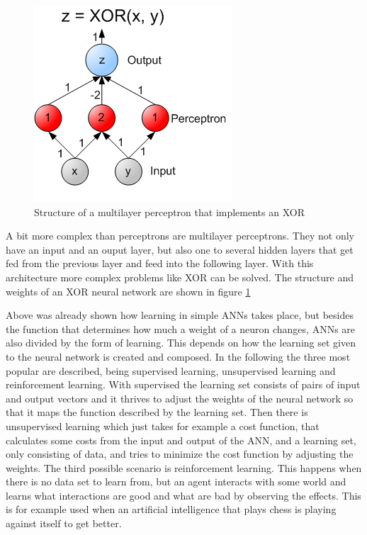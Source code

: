 \begin{figure}[ht]
	\centering
  \includegraphics[scale=0.7]{figures/multilayer_XOR.png}
	\caption[Structure of a multilayer perceptron that implements an XOR]{Structure of a multilayer perceptron that implements an XOR \protect\footnotemark}
	\label{multilayer_XOR}
\end{figure}

A bit more complex than perceptrons are multilayer perceptrons. They not only have an input and an ouput layer, but also one to several hidden layers that get fed from the previous layer and feed into the following layer. With this architecture more complex problems like XOR can be solved. The structure and weights of an XOR neural network are shown in figure \ref{multilayer_XOR}

Above was already shown how learning in simple ANNs takes place, but besides the function that determines how much a weight of a neuron changes, ANNs are also divided by the form of learning. This depends on how the learning set given to the neural network is created and composed. In the following the three most popular are described, being supervised learning, unsupervised learning and reinforcement learning. With supervised the learning set consists of pairs of input and output vectors and it thrives to adjust the weights of the neural network so that it maps the function described by the learning set. Then there is unsupervised learning which just takes for example a cost function, that calculates some costs from the input and output of the ANN, and a learning set, only consisting of data, and tries to minimize the cost function by adjusting the weights. The third possible scenario is reinforcement learning. This happens when there is no data set to learn from, but an agent interacts with some world and learns what interactions are good and what are bad by observing the effects. This is for example used when an artificial intelligence that plays chess is playing against itself to get better.


